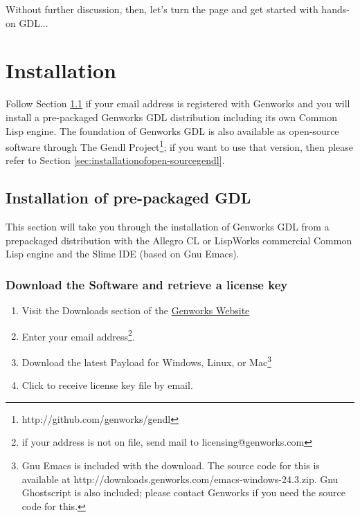 \documentclass [11pt]{book}
\begin{document}
Without further discussion, then, let's turn the page and get
      started with hands-on GDL...

\chapter{Installation}

\label{chap:installation}

Follow Section 
\ref{sec:installationofpre-packagedgdl} if your email address is registered with Genworks and you will
install a pre-packaged Genworks GDL distribution including its own
Common Lisp engine.  The foundation of Genworks GDL is also available
as open-source software through The Gendl Project\footnote{http://github.com/genworks/gendl}; if you want to use that version, then please refer to Section 
\ref{sec:installationofopen-sourcegendl}.

\section{Installation of pre-packaged GDL}

\label{sec:installationofpre-packagedgdl}

This section will take you through the installation of
Genworks GDL from a prepackaged distribution with the Allegro CL or
LispWorks commercial Common Lisp engine and the Slime IDE (based on
Gnu Emacs).

\subsection{Download the Software and retrieve a license key}

\label{subsec:downloadthesoftwareandretrievealicensekey}



\begin{enumerate}

\item Visit the Downloads section of the \href{http://genworks.com}{Genworks Website}

\item Enter your email address\footnote{if your address is not on file, send mail to licensing@genworks.com}.

\item Download the latest Payload for Windows, Linux, or Mac\footnote{Gnu Emacs is included with the download. The source code for this 
is available at http://downloads.genworks.com/emacs-windows-24.3.zip. Gnu Ghostscript
is also included; please contact Genworks if you need the source code for this.}

\item Click to receive license key file by email.

\end{enumerate}
\end{document}
